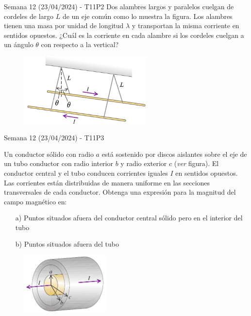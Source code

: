 \begin{frame}{Semana 12 (23/04/2024) - T11P2}
    Dos alambres largos y paralelos cuelgan de cordeles de
largo $L$ de un eje común como lo muestra la figura. Los alambres tienen
una masa por unidad de longitud $\lambda$ y transportan la misma
corriente en sentidos opuestos. ¿Cuál es la corriente en cada alambre si
los cordeles cuelgan a un ángulo $\theta$ con respecto a la vertical?
    
    \begin{figure}
        \centering
        \includegraphics[width=0.6\textwidth]{figures/t11p2.png}
    \end{figure}
\end{frame}

\begin{frame}{Semana 12 (23/04/2024) - T11P3}

Un conductor sólido con radio $a$ está sostenido por discos aislantes sobre el eje de un tubo conductor con radio interior $b$ y radio exterior $c$ (\textit{ver} figura). El conductor central y el tubo conducen corrientes
iguales $I$ en sentidos opuestos. Las
corrientes están distribuidas de
manera uniforme en las secciones
transversales de cada conductor. Obtenga una expresión para la magnitud del campo magnético en:

\begin{itemize}
    \item[a)] Puntos situados afuera del conductor
central sólido pero en el interior del tubo
    \item[b)] Puntos
situados afuera del tubo
\end{itemize}

\begin{figure}
        \centering
        \includegraphics[width=0.4\textwidth]{figures/t11p3.png}
    \end{figure}
    
\end{frame}

